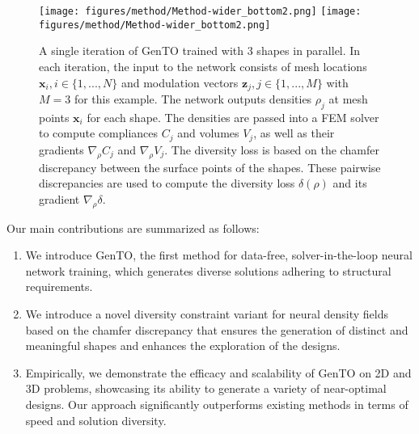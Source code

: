 \begin{figure*}[ht!]
    \centering
        \texttt{[image: figures/method/Method-wider\_bottom2.png]}
    \else
        \texttt{[image: figures/method/Method-wider\_bottom2.png]}
    \fi
    \caption{A single iteration of GenTO trained with 3 shapes in parallel.
    In each iteration, the input to the network consists of mesh locations $\mathbf{x}_i, i \in \{1, ...,  N\}$ and modulation vectors $\mathbf{z}_j, j \in \{1, ..., M\}$ with $M=3$ for this example.
    The network outputs densities $\rho_j$ at mesh points $\mathbf{x}_i $ for each shape.
    The densities are passed into a FEM solver to compute compliances $C_j$ and volumes $V_j$, as well as their gradients $\nabla_\rho C_j$ and $\nabla_\rho V_j$.
    The diversity loss is based on the chamfer discrepancy between the surface points of the shapes.
    These pairwise discrepancies are used to compute the diversity loss $\delta(\rho)$ and its gradient $\nabla_\rho \delta$.
    }
    \label{fig:placeholder}
\end{figure*}

    \newpage
\fi

Our main contributions are summarized as follows:
    
\begin{enumerate}
    \item We introduce GenTO, the first method for data-free, solver-in-the-loop neural network training, which generates diverse solutions adhering to structural requirements.
    \item We introduce a novel diversity constraint variant for neural density fields based on the chamfer discrepancy that ensures the generation of distinct and meaningful shapes and enhances the exploration of the designs.
    \item Empirically, we demonstrate the efficacy and scalability of GenTO on 2D and 3D problems, showcasing its ability to generate a variety of near-optimal designs.
    Our approach significantly outperforms existing methods in terms of speed and solution diversity.

\end{enumerate}


